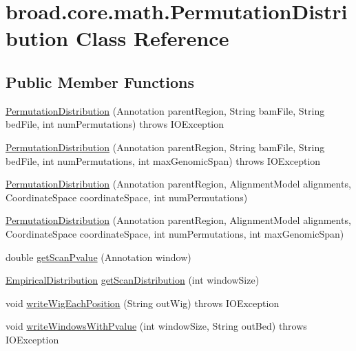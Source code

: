 \hypertarget{classbroad_1_1core_1_1math_1_1_permutation_distribution}{\section{broad.\+core.\+math.\+Permutation\+Distribution Class Reference}
\label{classbroad_1_1core_1_1math_1_1_permutation_distribution}
}
\subsection*{Public Member Functions}
\begin{DoxyCompactItemize}
\item 
\hyperlink{classbroad_1_1core_1_1math_1_1_permutation_distribution_a7a37bd253f3dbdd71400fb4ab16d77f4}{Permutation\+Distribution} (Annotation parent\+Region, String bam\+File, String bed\+File, int num\+Permutations)  throws I\+O\+Exception 
\item 
\hyperlink{classbroad_1_1core_1_1math_1_1_permutation_distribution_aa379bbeb09128585cebb5fc922cd4757}{Permutation\+Distribution} (Annotation parent\+Region, String bam\+File, String bed\+File, int num\+Permutations, int max\+Genomic\+Span)  throws I\+O\+Exception 
\item 
\hyperlink{classbroad_1_1core_1_1math_1_1_permutation_distribution_aa1022e2116c2ecbb3346807817c51111}{Permutation\+Distribution} (Annotation parent\+Region, Alignment\+Model alignments, Coordinate\+Space coordinate\+Space, int num\+Permutations)
\item 
\hyperlink{classbroad_1_1core_1_1math_1_1_permutation_distribution_aeeabc414789e3349db4a875c9f81d51e}{Permutation\+Distribution} (Annotation parent\+Region, Alignment\+Model alignments, Coordinate\+Space coordinate\+Space, int num\+Permutations, int max\+Genomic\+Span)
\item 
double \hyperlink{classbroad_1_1core_1_1math_1_1_permutation_distribution_adeb49888f4ff5c275859a9a4f306c5e9}{get\+Scan\+Pvalue} (Annotation window)
\item 
\hyperlink{classbroad_1_1core_1_1math_1_1_empirical_distribution}{Empirical\+Distribution} \hyperlink{classbroad_1_1core_1_1math_1_1_permutation_distribution_a1f13a6af358b1359c0d56833ceefac11}{get\+Scan\+Distribution} (int window\+Size)
\item 
void \hyperlink{classbroad_1_1core_1_1math_1_1_permutation_distribution_ae531b99c9afb0b405018df412907ee5d}{write\+Wig\+Each\+Position} (String out\+Wig)  throws I\+O\+Exception 
\item 
void \hyperlink{classbroad_1_1core_1_1math_1_1_permutation_distribution_a449635db64f5a7d8ca811860f1247892}{write\+Windows\+With\+Pvalue} (int window\+Size, String out\+Bed)  throws I\+O\+Exception 
\end{DoxyCompactItemize}
